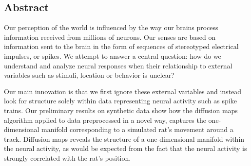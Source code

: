 
\thispagestyle{empty}

\begin{center}
    \Large
    
\section*{Abstract}


\end{center}

\vspace{1cm}


Our perception of the world is influenced by the way our brains process information received from millions of neurons.
Our senses are based on information sent to the brain in the form of sequences of stereotyped electrical impulses, or spikes.
We attempt to answer a central question: how do we understand and analyze neural responses when their relationship to external variables such as stimuli, location or behavior  is unclear?


Our main innovation is that we  first ignore these external variables and instead look for structure solely within data representing neural activity such as spike trains. Our preliminary results on synthetic data show how the diffusion maps algorithm applied to data preprocessed in a novel way, captures the  one-dimensional manifold corresponding to a simulated rat's movement around a track. Diffusion maps reveals the structure of a one-dimensional manifold within the neural activity, as would be expected from the fact that the neural activity is strongly correlated with the rat's position.





  \vfill





\newpage